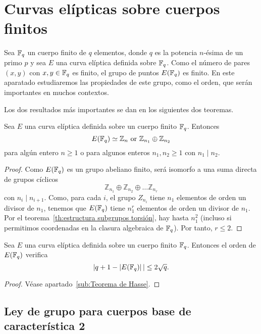 \clearpage

\section{Curvas elípticas sobre cuerpos finitos}
\label{sec:Curvas elípticas sobre cuerpos finitos}

Sea $\mathbb{F}_q$ un cuerpo finito de $q$ elementos, donde $q$ es la potencia $n$-ésima de un primo $p$ y sea $E$ una curva elíptica definida sobre $\mathbb{F}_q$. Como el número de pares $(x, y)$ con $x, y \in \mathbb{F}_q$ es finito, el grupo de puntos $E(\mathbb{F}_q)$ es finito. En este aparatado estudiaremos las propiedades de este grupo, como el orden, que serán importantes en muchos contextos.

Los dos resultados más importantes se dan en los siguientes dos teoremas.

\begin{teorema}\label{th:estructura grupo puntos}
	Sea $E$ una curva elíptica definida sobre un cuerpo finito $\mathbb{F}_q$. Entonces
	$$
		E(\mathbb{F}_q) \simeq \mathbb{Z}_n \textrm{ or } \mathbb{Z}_{n_1} \oplus \mathbb{Z}_{n_2}
	$$
	para algún entero $n \ge 1$ o para algunos enteros $n_1, n_2 \ge 1$ con $n_1 \mid n_2$.
\end{teorema}
\begin{proof}
Como $E(\mathbb{F}_q)$ es un grupo abeliano finito, será isomorfo a una suma directa de grupos cíclicos
$$
	\mathbb{Z}_{n_1} \oplus \mathbb{Z}_{n_2} \oplus \dots \mathbb{Z}_{n_r}
$$
con $n_i \mid n_{i+1}$. Como, para cada $i$, el grupo $Z_{n_i}$ tiene $n_1$ elementos de orden un divisor de $n_1$, tenemos que $E(\mathbb{F}_q)$ tiene $n_1^r$ elementos de orden un divisor de $n_1$. Por el teorema~\ref{th:estructura subgrupos torsión}, hay hasta $n_1^2$ (incluso si permitimos coordenadas en la clasura algebraica de $\mathbb{F}_q$). Por tanto, $r \le 2$.
\end{proof}

\begin{teorema}\label{th:teorema de Hasse}
	Sea $E$ una curva elíptica definida sobre un cuerpo finito $\mathbb{F}_q$. Entonces el orden de $E(\mathbb{F}_q)$ verifica
	$$
		|q + 1 - \left\vert{E(\mathbb{F}_{q})}\right\vert| \le 2 \sqrt{q}.
	$$
\end{teorema}
\begin{proof}
	Véase apartado~\ref{sub:Teorema de Hasse}.
\end{proof}


\subsection{Ley de grupo para cuerpos base de característica 2}
\label{sub:Ley de grupo para cuerpos base de característica 2}


